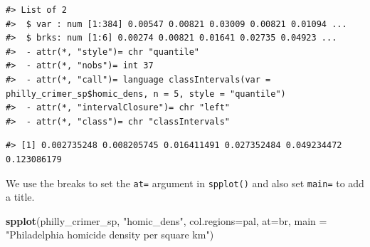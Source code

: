 \documentclass[]{book}
\newenvironment{Shaded}{\begin{snugshade}}{\end{snugshade}}
\newcommand{\KeywordTok}[1]{\textcolor[rgb]{0.13,0.29,0.53}{\textbf{#1}}}
\newcommand{\DataTypeTok}[1]{\textcolor[rgb]{0.13,0.29,0.53}{#1}}
\newcommand{\DecValTok}[1]{\textcolor[rgb]{0.00,0.00,0.81}{#1}}
\newcommand{\FloatTok}[1]{\textcolor[rgb]{0.00,0.00,0.81}{#1}}
\newcommand{\StringTok}[1]{\textcolor[rgb]{0.31,0.60,0.02}{#1}}
\newcommand{\CommentTok}[1]{\textcolor[rgb]{0.56,0.35,0.01}{\textit{#1}}}
\newcommand{\OperatorTok}[1]{\textcolor[rgb]{0.81,0.36,0.00}{\textbf{#1}}}
\newcommand{\NormalTok}[1]{#1}
\theoremstyle{definition}
\theoremstyle{definition}
\theoremstyle{definition}
\theoremstyle{remark}
\begin{document}
\begin{verbatim}
#> List of 2
#>  $ var : num [1:384] 0.00547 0.00821 0.03009 0.00821 0.01094 ...
#>  $ brks: num [1:6] 0.00274 0.00821 0.01641 0.02735 0.04923 ...
#>  - attr(*, "style")= chr "quantile"
#>  - attr(*, "nobs")= int 37
#>  - attr(*, "call")= language classIntervals(var = philly_crimer_sp$homic_dens, n = 5, style = "quantile")
#>  - attr(*, "intervalClosure")= chr "left"
#>  - attr(*, "class")= chr "classIntervals"
\end{verbatim}

\begin{Shaded}
\end{Shaded}

\begin{verbatim}
#> [1] 0.002735248 0.008205745 0.016411491 0.027352484 0.049234472 0.123086179
\end{verbatim}

\begin{Shaded}
\end{Shaded}

We use the breaks to set the \texttt{at=} argument in \texttt{spplot()}
and also set \texttt{main=} to add a title.

\begin{Shaded}
\begin{Highlighting}[]
\KeywordTok{spplot}\NormalTok{(philly_crimer_sp, }\StringTok{"homic_dens"}\NormalTok{, }\DataTypeTok{col.regions=}\NormalTok{pal, }\DataTypeTok{at=}\NormalTok{br,  }\DataTypeTok{main =} \StringTok{"Philadelphia homicide density per square km"}\NormalTok{)}
\end{Highlighting}
\end{Shaded}
\end{document}
